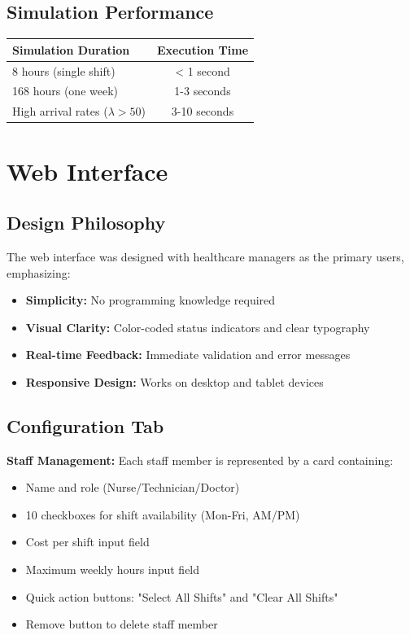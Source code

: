 \documentclass[12pt,a4paper]{article}
\begin{document}
\subsection{Simulation Performance}

\begin{center}
\begin{tabular}{lc}
\toprule
Simulation Duration & Execution Time \\
\midrule
8 hours (single shift) & < 1 second \\
168 hours (one week) & 1-3 seconds \\
High arrival rates ($\lambda > 50$) & 3-10 seconds \\
\bottomrule
\end{tabular}
\end{center}

\newpage

\section{Web Interface}
\label{sec:interface}

\subsection{Design Philosophy}
\label{subsec:design-philosophy}

The web interface was designed with healthcare managers as the primary users, emphasizing:
\begin{itemize}
    \item \textbf{Simplicity:} No programming knowledge required
    \item \textbf{Visual Clarity:} Color-coded status indicators and clear typography
    \item \textbf{Real-time Feedback:} Immediate validation and error messages
    \item \textbf{Responsive Design:} Works on desktop and tablet devices
\end{itemize}

\subsection{Configuration Tab}

\textbf{Staff Management:}
Each staff member is represented by a card containing:
\begin{itemize}
    \item Name and role (Nurse/Technician/Doctor)
    \item 10 checkboxes for shift availability (Mon-Fri, AM/PM)
    \item Cost per shift input field
    \item Maximum weekly hours input field
    \item Quick action buttons: "Select All Shifts" and "Clear All Shifts"
    \item Remove button to delete staff member
\end{itemize}
\end{document}
